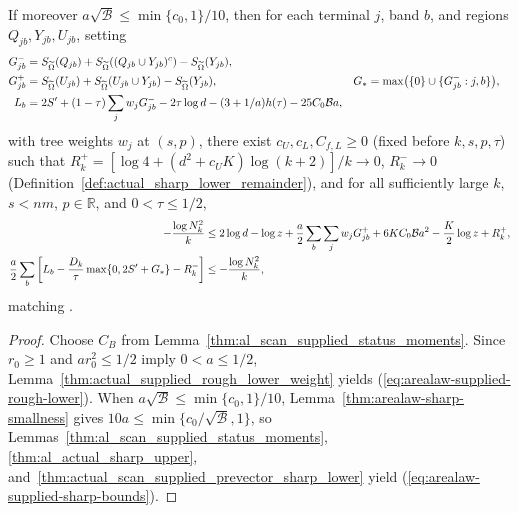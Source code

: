 \begin{lemma}
    If moreover $a\sqrt{\mathcal B}\leq\min\{c_0,1\}/10$, then for each terminal $j$, band $b$, and regions $Q_{jb},Y_{jb},U_{jb}$, setting
    \begin{align}
        G^-_{jb}                       & =S_{\widetilde\Omega}(Q_{jb})
        +S_{\widetilde\Omega}((Q_{jb}\cup Y_{jb})^c)
        -S_{\widetilde\Omega}(Y_{jb}),\notag                                               \\
        G^+_{jb}                       & =S_{\widetilde\Omega}(U_{jb})
        +S_{\widetilde\Omega}(U_{jb}\cup Y_{jb})
        -S_{\widetilde\Omega}(Y_{jb}), &
        G_*                            & =\max\bigl(\{0\}\cup\{G^-_{jb}:j,b\}\bigr),\notag \\
        L_b                            & =2S'+(1-\tau)\sum_jw_jG^-_{jb}
        -2\tau\log d-(3+1/a)h(\tau)-25C_0\mathcal B a,\notag
    \end{align}
    with tree weights $w_j$ at $(s,p)$, there exist $c_U,c_L,C_{f,L}\geq0$ (fixed before $k,s,p,\tau$) such that $R_k^+=[\log4+(d^2+c_UK)\log(k+2)]/k\to0$, $R_k^-\to0$ (Definition~\ref{def:actual_sharp_lower_remainder}), and for all sufficiently large $k$, $s<nm$, $p\in\mathbb R$, and $0<\tau\leq1/2$,
    \begin{align}
        -\frac{\log N_k^2}{k}
         & \leq2\log d-\log z+\frac a2\sum_b\sum_jw_jG^+_{jb}
        +6KC_0\mathcal B a^2-\frac K2\log z+R_k^+,\notag      \\
        \frac a2\sum_b\left[L_b
            -\frac{D_k}{\tau}\max\{0,2S'+G_*\}-R_k^-\right]
         & \leq-\frac{\log N_k^2}{k},
        \label{eq:arealaw-supplied-sharp-bounds}
    \end{align}
    matching \cite[Proposition~9.2, lines~386--395]{OpenAI2026AreaLaw}.
\end{lemma}
\begin{proof}
    \leanok
    Choose $C_B$ from Lemma~\ref{thm:al_scan_supplied_status_moments}. Since $r_0\ge1$ and $ar_0^2\le1/2$ imply $0<a\le1/2$, Lemma~\ref{thm:actual_supplied_rough_lower_weight} yields (\ref{eq:arealaw-supplied-rough-lower}). When $a\sqrt{\mathcal B}\le\min\{c_0,1\}/10$, Lemma~\ref{thm:arealaw-sharp-smallness} gives $10a\le\min\{c_0/\sqrt{\mathcal B},1\}$, so Lemmas~\ref{thm:al_scan_supplied_status_moments}, \ref{thm:al_actual_sharp_upper}, and~\ref{thm:actual_scan_supplied_prevector_sharp_lower} yield (\ref{eq:arealaw-supplied-sharp-bounds}).
\end{proof}
